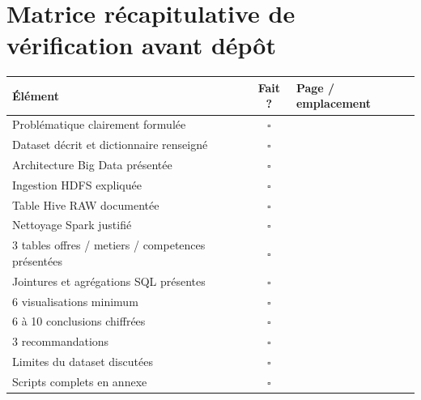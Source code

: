 \newpage
\section*{Matrice récapitulative de vérification avant dépôt}
\begin{longtable}{p{7cm}cp{4cm}}
\toprule
Élément & Fait ? & Page / emplacement \\
\midrule
\endhead
Problématique clairement formulée & $\square$ & \\
Dataset décrit et dictionnaire renseigné & $\square$ & \\
Architecture Big Data présentée & $\square$ & \\
Ingestion HDFS expliquée & $\square$ & \\
Table Hive RAW documentée & $\square$ & \\
Nettoyage Spark justifié & $\square$ & \\
3 tables offres / metiers / competences présentées & $\square$ & \\
Jointures et agrégations SQL présentes & $\square$ & \\
6 visualisations minimum & $\square$ & \\
6 à 10 conclusions chiffrées & $\square$ & \\
3 recommandations & $\square$ & \\
Limites du dataset discutées & $\square$ & \\
Scripts complets en annexe & $\square$ & \\
\bottomrule
\end{longtable}
